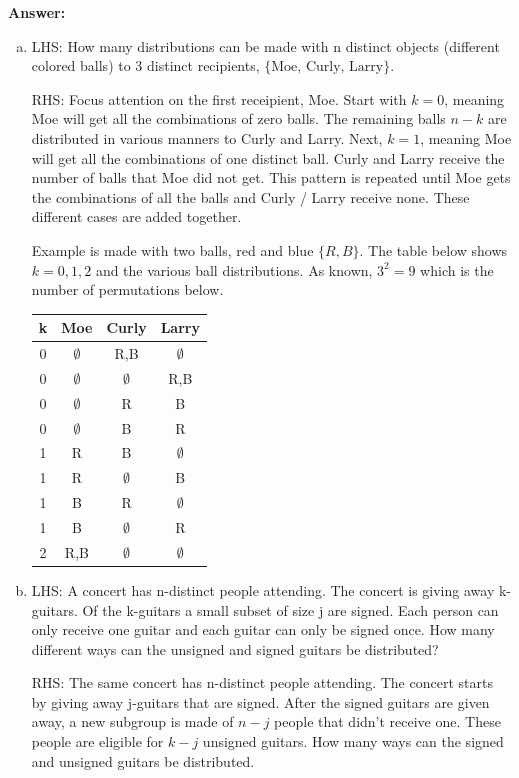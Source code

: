 \documentclass{article}
\begin{document}
\textbf{Answer:}
\begin{enumerate}[(a)]
    \item LHS: How many distributions can be made with n distinct objects (different colored balls) to 3 distinct recipients, $\{\text{Moe, Curly, Larry}\}$.
    
    \medskip
    RHS: Focus attention on the first receipient, Moe. Start with $k=0$, meaning Moe will get all the combinations of zero balls. The remaining balls $n-k$ are distributed in various manners to Curly and Larry. Next, $k=1$, meaning Moe will get all the combinations of one distinct ball. Curly and Larry receive the number of balls that Moe did not get. This pattern is repeated until Moe gets the combinations of all the balls and Curly / Larry receive none. These different cases are added together.

    \medskip
    Example is made with two balls, red and blue $\{R, B\}$. The table below shows $k = 0,1,2$ and the various ball distributions. As known, $3^2 = 9$ which is the number of permutations below.

    \begin{center}
    \begin{tabular}{ |c|c|c|c| } 
    \hline
    k & Moe & Curly & Larry \\ 
    \hline
    0 & $\emptyset$ & R,B&  $\emptyset$ \\
    0 & $\emptyset$ & $\emptyset$ &  R,B \\
    0 & $\emptyset$ & R &  B \\
    0 & $\emptyset$ & B &  R \\
    1 & R & B &  $\emptyset$ \\
    1 & R & $\emptyset$ &  B \\
    1 & B & R &  $\emptyset$ \\
    1 & B & $\emptyset$ &  R \\
    2 & R,B & $\emptyset$ &  $\emptyset$ \\
    \hline
    \end{tabular}
    \end{center}

    \item LHS: A concert has n-distinct people attending. The concert is giving away k-guitars. Of the k-guitars a small subset of size j are signed. Each person can only receive one guitar and each guitar can only be signed once. How many different ways can the unsigned and signed guitars be distributed?
    
    \medskip
    RHS: The same concert has n-distinct people attending. The concert starts by giving away j-guitars that are signed. After the signed guitars are given away, a new subgroup is made of $n-j$ people that didn't receive one. These people are eligible for $k-j$ unsigned guitars. How many ways can the signed and unsigned guitars be distributed.


\end{enumerate}
\end{document}
